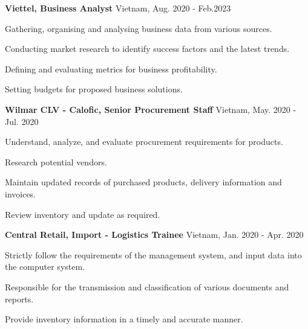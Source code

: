 \begin{cventries} %
  \cvsimpleentry
    {\textbf{Viettel, Business Analyst}} %
    {Vietnam, Aug. 2020 - Feb.2023} %
    {
      \begin{cvitems} %
        \item {Gathering, organising and analysing business data from various sources.}
        \item {Conducting market research to identify success factors and the latest trends.}
        \item {Defining and evaluating metrics for business profitability.}
        \item {Setting budgets for proposed business solutions.}
      \end{cvitems}
    }

  \cvsimpleentry
    {\textbf{Wilmar CLV - Calofic, Senior Procurement Staff}} %
    {Vietnam, May. 2020 - Jul. 2020} %
    {
      \begin{cvitems} %
        \item {Understand, analyze, and evaluate procurement requirements for products.}
        \item {Research potential vendors.}
        \item {Maintain updated records of purchased products, delivery information and invoices.}
        \item {Review inventory and update as required.}
      \end{cvitems}
    }

  \cvsimpleentry
    {\textbf{Central Retail, Import - Logistics Trainee}} %
    {Vietnam, Jan. 2020 - Apr. 2020} %
    {
      \begin{cvitems} %
        \item {Strictly follow the requirements of the management system, and input data into the computer system.}
        \item {Responsible for the transmission and classification of various documents and reports.}
        \item {Provide inventory information in a timely and accurate manner.}
      \end{cvitems}
    }

\end{cventries}
